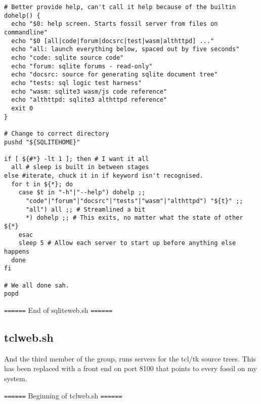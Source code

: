 \documentclass[11pt]{article}
\begin{document}
\begin{verbatim}
# Better provide help, can't call it help because of the builtin
dohelp() {
  echo "$0: help screen. Starts fossil server from files on commandline"
  echo "$0 [all|code|forum|docsrc|test|wasm|althttpd] ..."
  echo "all: launch everything below, spaced out by five seconds"
  echo "code: sqlite source code"
  echo "forum: sqlite forums - read-only"
  echo "docsrc: source for generating sqlite document tree"
  echo "tests: sql logic test harness"
  echo "wasm: sqlite3 wasm/js code reference"
  echo "althttpd: sqlite3 althttpd reference"
  exit 0
}

# Change to correct directory
pushd "${SQLITEHOME}"

if [ ${#*} -lt 1 ]; then # I want it all
  all # sleep is built in between stages
else #iterate, chuck it in if keyword isn't recognised.
  for t in ${*}; do
    case $t in "-h"|"--help") dohelp ;;
      "code"|"forum"|"docsrc"|"tests"|"wasm"|"althttpd") "${t}" ;;
      "all") all ;; # Streamlined a bit
      *) dohelp ;; # This exits, no matter what the state of other ${*}
    esac
    sleep 5 # Allow each server to start up before anything else happens
  done
fi

# We all done sah.
popd

\end{verbatim}

\texttt{======} End of sqliteweb.sh \texttt{======}

\subsection*{tclweb.sh}
\label{sec:org9a7cac1}

And the third member of the group, runs servers for the tcl/tk source trees. This has been replaced
with a front end on port 8100 that points to every fossil on my system.

\texttt{======} Beginning of tclweb.sh \texttt{======}
\end{document}
